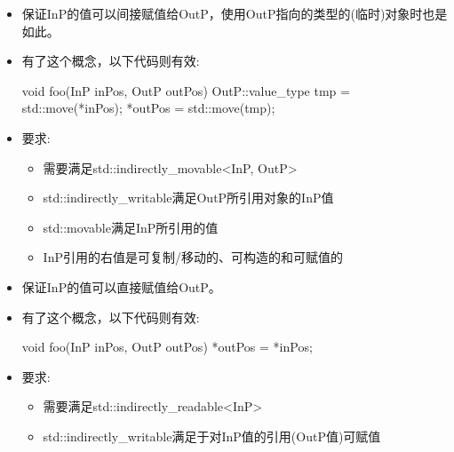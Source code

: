 
\begin{itemize}
\item
保证InP的值可以间接赋值给OutP，使用OutP指向的类型的(临时)对象时也是如此。

\item
有了这个概念，以下代码则有效:

\begin{cpp}
void foo(InP inPos, OutP outPos) {
	OutP::value_type tmp = std::move(*inPos);
	*outPos = std::move(tmp);
}
\end{cpp}

\item
要求:
\begin{itemize}
\item
需要满足std::indirectly\_movable<InP, OutP>

\item
std::indirectly\_writable满足OutP所引用对象的InP值

\item
std::movable满足InP所引用的值

\item
InP引用的右值是可复制/移动的、可构造的和可赋值的
\end{itemize}
\end{itemize}


\begin{itemize}
\item
保证InP的值可以直接赋值给OutP。

\item
有了这个概念，以下代码则有效:

\begin{cpp}
void foo(InP inPos, OutP outPos) {
	*outPos = *inPos;
}
\end{cpp}

\item
要求:
\begin{itemize}
\item
需要满足std::indirectly\_readable<InP>

\item
std::indirectly\_writable满足于对InP值的引用(OutP值)可赋值
\end{itemize}
\end{itemize}


